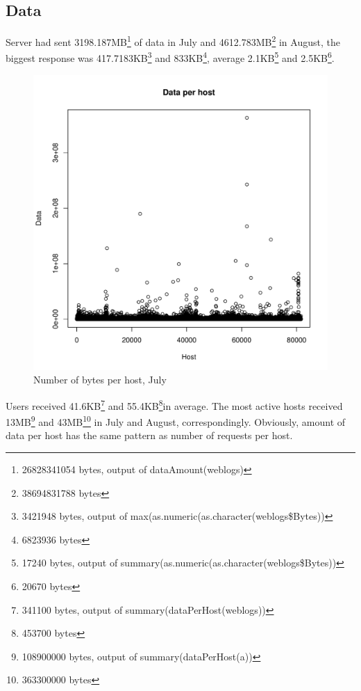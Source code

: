 \documentclass[english]{article}
\begin{document}
\subsection{Data}
Server had sent 3198.187MB\footnote{26828341054 bytes, output of dataAmount(weblogs)} of data in July and 4612.783MB\footnote{38694831788 bytes} in August, the biggest response was 417.7183KB\footnote{3421948 bytes, output of max(as.numeric(as.character(weblogs\$Bytes))} and  833KB\footnote{6823936 bytes}, average 2.1KB\footnote{17240 bytes, output of summary(as.numeric(as.character(weblogs\$Bytes))} and 2.5KB\footnote{20670 bytes}.
\begin{figure}[H]
\centerline{\includegraphics{Weblogs/Jul/DataPerHost.pdf}}
\caption{Number of bytes per host, July}
\end{figure}
Users received 41.6KB\footnote{341100 bytes, output of summary(dataPerHost(weblogs))} and 55.4KB\footnote{453700 bytes}in average. The most active hosts received 13MB\footnote{108900000 bytes, output of summary(dataPerHost(a))} and 43MB\footnote{363300000 bytes} in July and August, correspondingly.
Obviously, amount of data per host has the same pattern as number of requests per host.
\end{document}
